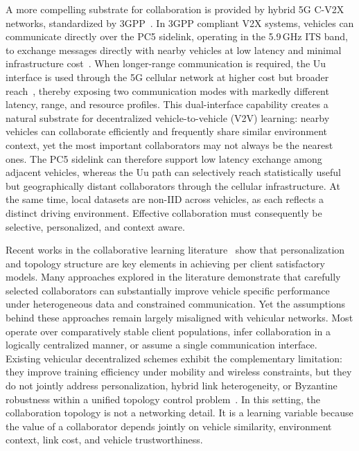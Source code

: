 A more compelling substrate for collaboration is provided by hybrid 5G C-V2X networks, standardized by 3GPP~\cite{3gpp2021architecture}. In 3GPP compliant V2X systems, vehicles can communicate directly over the PC5 sidelink, operating in the 5.9\,GHz ITS band, to exchange messages directly with nearby vehicles at low latency and minimal infrastructure cost~\cite{molina2017ltev}. When longer-range communication is required, the Uu interface is used through the 5G cellular network at higher cost but broader reach~\cite{garcia2021tutorial}, thereby exposing two communication modes with markedly different latency, range, and resource profiles. This dual-interface capability creates a natural substrate for decentralized vehicle-to-vehicle (V2V) learning: nearby vehicles can collaborate efficiently and frequently share similar environment context, yet the most important collaborators may not always be the nearest ones. The PC5 sidelink can therefore support low latency exchange among adjacent vehicles, whereas the Uu path can selectively reach statistically useful but geographically distant collaborators through the cellular infrastructure. At the same time, local datasets are non-IID across vehicles, as each reflects a distinct driving environment. Effective collaboration must consequently be selective, personalized, and context aware.

Recent works in the collaborative learning literature~\cite{kharrat2025dpfl,liu2024dfedpgp,ye2023pfedgraph,chen2022graph,zhang2021fedfomo,ma2021pfedatt,zantedeschi2020fully} show that personalization and topology structure are key elements in achieving per client satisfactory models. Many approaches explored in the literature demonstrate that carefully selected collaborators can substantially improve vehicle specific performance under heterogeneous data and constrained communication. Yet the assumptions behind these approaches remain largely misaligned with vehicular networks. Most operate over comparatively stable client populations, infer collaboration in a logically centralized manner, or assume a single communication interface. Existing vehicular decentralized schemes exhibit the complementary limitation: they improve training efficiency under mobility and wireless constraints, but they do not jointly address personalization, hybrid link heterogeneity, or Byzantine robustness within a unified topology control problem~\cite{chen2025mobility,meng2025resource,yuan2023p2p}. In this setting, the collaboration topology is not a networking detail. It is a learning variable because the value of a collaborator depends jointly on vehicle similarity, environment context, link cost, and vehicle trustworthiness.

